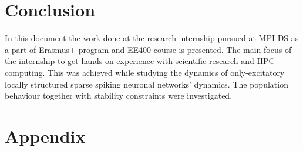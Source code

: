 \documentclass[a4paper,12pt]{article}
\begin{document}
\section{Conclusion}
In this document the work done at the research internship pursued at MPI-DS as a part of Erasmus+ program and EE400 course is presented. The main focus of the internship to get hands-on experience with scientific research and HPC computing. This was achieved while studying the dynamics of only-excitatory locally structured sparse spiking neuronal networks' dynamics. The population behaviour together with stability constraints were investigated.
 

\section{Appendix}
\end{document}
